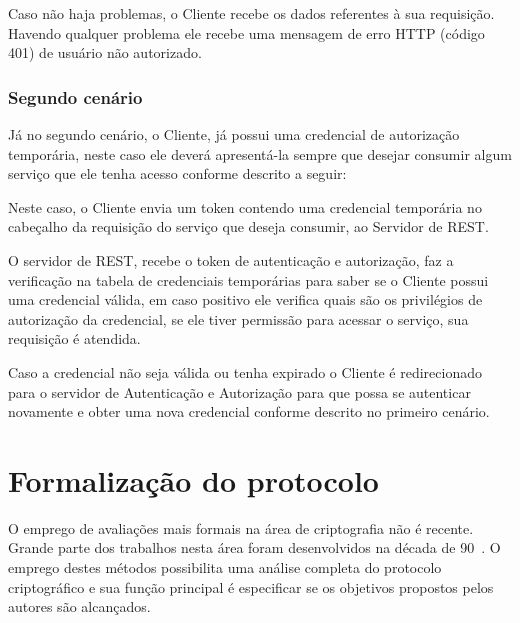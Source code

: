 Caso não haja problemas, o Cliente recebe os dados referentes à sua requisição. Havendo qualquer problema ele recebe uma mensagem de erro HTTP (código 401) de usuário não autorizado.

\subsubsection{Segundo cenário}

Já no segundo cenário, o Cliente, já possui uma credencial de autorização temporária, neste caso ele deverá apresentá-la sempre que desejar consumir algum serviço que ele tenha acesso conforme descrito a seguir:

Neste caso, o Cliente envia um token contendo uma credencial temporária no cabeçalho da requisição do serviço que deseja consumir, ao Servidor de REST.

O servidor de REST, recebe o token de autenticação e autorização, faz a verificação na tabela de credenciais temporárias para saber se o Cliente possui uma credencial válida, em caso positivo ele verifica quais são os privilégios de autorização da credencial, se ele tiver permissão para acessar o serviço, sua requisição é atendida.

Caso a credencial não seja válida ou tenha expirado o Cliente é redirecionado para o servidor de Autenticação e Autorização para que possa se autenticar novamente e obter uma nova credencial conforme descrito no primeiro cenário. %



\section{Formalização do protocolo}

O emprego de avaliações mais formais na área de criptografia não é recente. Grande parte dos trabalhos nesta área foram desenvolvidos na década de 90~\cite{Meadows95}. O emprego destes métodos possibilita uma análise completa do protocolo criptográfico e sua função principal é especificar se os objetivos propostos pelos autores são alcançados.

